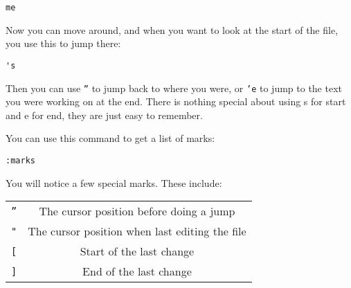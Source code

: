  \begin{Verbatim}[samepage=true]
 me
 \end{Verbatim}

Now you can move around, and when you want to look at the start of the file, you use this to jump there:

 \begin{Verbatim}[samepage=true]
 's
 \end{Verbatim}

Then you can use \texttt{''} to jump back to where you were, or \texttt{'e} to jump to the text
you were working on at the end.
There is nothing special about using s for start and e for end, they are
just easy to remember.

You can use this command to get a list of marks:

 \begin{Verbatim}[samepage=true]
 :marks
 \end{Verbatim}

You will notice a few special marks.  These include:
\begin{center}
				\begin{tabular}{c c}
				\texttt{''} & The cursor position before doing a jump\\
				\texttt{"} & The cursor position when last editing the file\\
				\texttt{[} & Start of the last change\\
				\texttt{]} &   End of the last change\\
\end{tabular}
\end{center}
\clearpage
